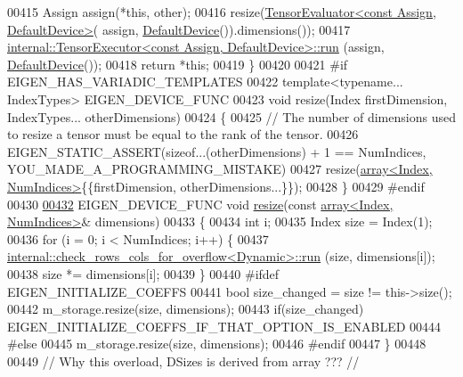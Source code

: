 \begin{DoxyCode}
00415       Assign assign(*\textcolor{keyword}{this}, other);
00416       resize(\hyperlink{struct_eigen_1_1_tensor_evaluator}{TensorEvaluator<const Assign, DefaultDevice>}(
      assign, \hyperlink{struct_eigen_1_1_default_device}{DefaultDevice}()).dimensions());
00417       \hyperlink{class_eigen_1_1internal_1_1_tensor_executor}{internal::TensorExecutor<const Assign, DefaultDevice>::run}
      (assign, \hyperlink{struct_eigen_1_1_default_device}{DefaultDevice}());
00418       \textcolor{keywordflow}{return} *\textcolor{keyword}{this};
00419     \}
00420 
00421 \textcolor{preprocessor}{#if EIGEN\_HAS\_VARIADIC\_TEMPLATES}
00422     \textcolor{keyword}{template}<\textcolor{keyword}{typename}... IndexTypes> EIGEN\_DEVICE\_FUNC
00423     \textcolor{keywordtype}{void} resize(Index firstDimension, IndexTypes... otherDimensions)
00424     \{
00425       \textcolor{comment}{// The number of dimensions used to resize a tensor must be equal to the rank of the tensor.}
00426       EIGEN\_STATIC\_ASSERT(\textcolor{keyword}{sizeof}...(otherDimensions) + 1 == NumIndices, YOU\_MADE\_A\_PROGRAMMING\_MISTAKE)
00427       resize(\hyperlink{class_eigen_1_1array}{array<Index, NumIndices>}\{\{firstDimension, otherDimensions...\}\});
00428     \}
00429 \textcolor{preprocessor}{#endif}
00430 
\hyperlink{class_eigen_1_1_tensor_a5ab1ec6dc9b05d5e4db3600bc9d2cc6b}{00432}     EIGEN\_DEVICE\_FUNC \textcolor{keywordtype}{void} \hyperlink{class_eigen_1_1_tensor_a5ab1ec6dc9b05d5e4db3600bc9d2cc6b}{resize}(\textcolor{keyword}{const} \hyperlink{class_eigen_1_1array}{array<Index, NumIndices>}& dimensions)
00433     \{
00434       \textcolor{keywordtype}{int} i;
00435       Index size = Index(1);
00436       \textcolor{keywordflow}{for} (i = 0; i < NumIndices; i++) \{
00437         \hyperlink{struct_eigen_1_1internal_1_1check__rows__cols__for__overflow}{internal::check\_rows\_cols\_for\_overflow<Dynamic>::run}
      (size, dimensions[i]);
00438         size *= dimensions[i];
00439       \}
00440 \textcolor{preprocessor}{      #ifdef EIGEN\_INITIALIZE\_COEFFS}
00441         \textcolor{keywordtype}{bool} size\_changed = size != this->size();
00442         m\_storage.resize(size, dimensions);
00443         \textcolor{keywordflow}{if}(size\_changed) EIGEN\_INITIALIZE\_COEFFS\_IF\_THAT\_OPTION\_IS\_ENABLED
00444 \textcolor{preprocessor}{      #else}
00445         m\_storage.resize(size, dimensions);
00446 \textcolor{preprocessor}{      #endif}
00447     \}
00448 
00449     \textcolor{comment}{// Why this overload, DSizes is derived from array ??? //}

\end{DoxyCode}
